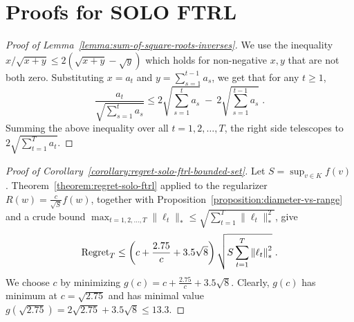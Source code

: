 \section{Proofs for SOLO FTRL}
\label{section:solo-ftrl-proofs}

\begin{proof}[Proof of Lemma~\ref{lemma:sum-of-square-roots-inverses}]
We use the inequality $x/\sqrt{x+y} \le 2(\sqrt{x+y} - \sqrt{y})$ which holds
for non-negative $x,y$ that are not both zero. Substituting $x = a_t$ and $y=\sum_{s=1}^{t-1} a_s$,
we get that for any $t \ge 1$,
$$
\frac{a_t}{\sqrt{\sum_{s=1}^t a_s}} \le 2 \sqrt{\sum_{s=1}^t a_s} \ - \ 2 \sqrt{\sum_{s=1}^{t-1} a_s} \; .
$$
Summing the above inequality over all $t=1,2,\dots,T$, the right side telescopes to
$2 \sqrt{\sum_{t=1}^T a_t}$.
\end{proof}

\begin{proof}[Proof of Corollary~\ref{corollary:regret-solo-ftrl-bounded-set}]
Let $S = \sup_{v \in K} f(v)$. Theorem~\ref{theorem:regret-solo-ftrl} applied
to the regularizer $R(w) = \frac{c}{\sqrt{S}} f(w)$, together with
Proposition~\ref{proposition:diameter-vs-range} and a crude bound
$\max_{t=1,2,\dots,T} \|\ell_t\|_* \le \sqrt{\sum_{t=1}^T \|\ell_t\|_*^2}$,
give
$$
\operatorname{Regret}_T \le \left(c + \frac{2.75}{c}  + 3.5\sqrt{8} \right) \sqrt{S \sum_{t=1}^{T} {\left\|{\ell_t}\right\|}_*^2} \; .
$$
We choose $c$ by minimizing $g(c) = c + \frac{2.75}{c} + 3.5\sqrt{8}$. Clearly,
$g(c)$ has minimum at $c = \sqrt{2.75}$ and has minimal value $g(\sqrt{2.75}) =
2\sqrt{2.75} + 3.5\sqrt{8} \le 13.3$.
\end{proof}
